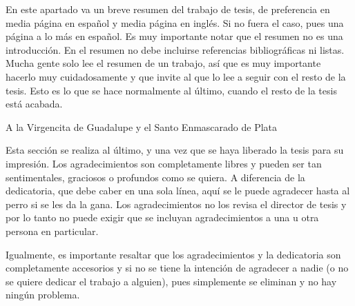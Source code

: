 \documentclass[12pt]{tesislcc}
\begin{document}




\portada

\frontmatter

%  
\begin{resumen}
En este apartado va un breve resumen del trabajo de tesis, de preferencia en media página en 
español y media página en inglés. Si no fuera el caso, pues una página a lo más en español. Es muy 
importante notar que el resumen no es una introducción. En el resumen no debe incluirse 
referencias bibliográficas ni listas. Mucha gente solo lee el resumen de un trabajo, así que es 
muy importante hacerlo muy cuidadosamente y que invite al que lo lee a seguir con el resto de la 
tesis. Esto es lo que se hace normalmente al último, cuando el resto de la tesis está acabada.
\end{resumen}

\begin{dedicatoria}
A la Virgencita de Guadalupe y el Santo Enmascarado de Plata
\end{dedicatoria}

\begin{agradecimientos}
Esta sección se realiza al último, y una vez que se haya liberado la
tesis para su impresión. Los agradecimientos son completamente libres y pueden ser tan 
sentimentales, graciosos o profundos como se quiera. A diferencia de la dedicatoria, que debe 
caber en una sola línea, aquí se le puede agradecer hasta al perro si se les da la gana. Los 
agradecimientos no los revisa el director de tesis y por lo tanto no puede exigir que se incluyan 
agradecimientos a una u otra
persona en particular.

Igualmente, es importante resaltar que los agradecimientos y la
dedicatoria son completamente accesorios y si no se tiene la intención de agradecer a nadie (o no 
se quiere dedicar el trabajo a alguien), pues simplemente se eliminan y no hay ningún problema.
\end{agradecimientos}
\end{document}
